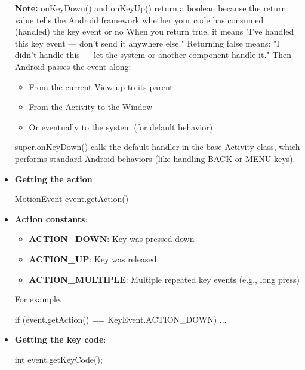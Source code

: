\documentclass{report}
\begin{document}
\begin{itemize}
\begin{itemize}
            \end{itemize}
            \bigbreak \noindent 
            \textbf{Note:}  onKeyDown() and onKeyUp() return a boolean because the return value tells the Android framework whether your code has consumed (handled) the key event or no
            \bigbreak \noindent 
            When you return true, it means "I've handled this key event — don’t send it anywhere else."
            \bigbreak \noindent 
            Returning false means: "I didn't handle this — let the system or another component handle it." Then Android passes the event along:
            \begin{itemize}
                \item From the current View up to its parent
                \item From the Activity to the Window
                \item Or eventually to the system (for default behavior)
            \end{itemize}
            super.onKeyDown() calls the default handler in the base Activity class, which performs standard Android behaviors (like handling BACK or MENU keys).
        \item \textbf{Getting the action}
            \bigbreak \noindent 
            \begin{javacode}
            MotionEvent event.getAction()
            \end{javacode}
        \item \textbf{Action constants}:
            \begin{itemize}
                \item \textbf{ACTION\_DOWN}: Key was pressed down
                \item \textbf{ACTION\_UP}: Key was released
                \item \textbf{ACTION\_MULTIPLE}: Multiple repeated key events (e.g., long press)
            \end{itemize}
            \bigbreak \noindent 
            For example,
            \bigbreak \noindent 
            \begin{javacode}
            if (event.getAction() == KeyEvent.ACTION_DOWN) { ... }
            \end{javacode}
        \item \textbf{Getting the key code}:
            \bigbreak \noindent 
            \begin{javacode}
            int event.getKeyCode();
            \end{javacode}

\end{itemize}
\end{document}
